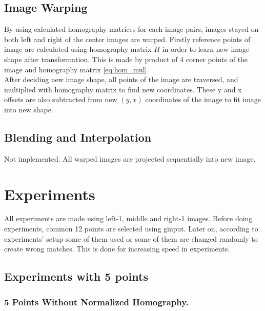 \documentclass[letterpaper,12pt]{article}
\begin{document}
\subsection{Image Warping}
By using calculated homography matrices for each image pairs, images stayed on both left and right of the center images are warped. 
Firstly reference points of image are calculated using homography matrix $H$ in order to learn new image shape after transformation. This is made by product of 4 corner points of the image and homography matrix \ref{eq:hom_mul}. 
\\
After deciding new image shape, all points of the image are traversed, and multiplied with homography matrix to find new coordinates. These y and x offsets are also subtracted from new $(y,x)$ coordinates of the image to fit image into new shape.
\subsection{Blending and Interpolation}
Not implemented. All warped images are projected sequentially into new image.
\section{Experiments}
All experiments are made using left-1, middle and right-1 images. Before doing experiments, common 12 points are selected using ginput. Later on, according to experiments' setup some of them used or some of them are changed randomly to create wrong matches. This is done for increasing speed in experiments.
\newpage
\subsection{Experiments with 5 points}
\subsubsection{5 Points Without Normalized Homography.}
\end{document}
